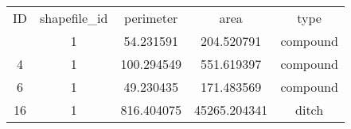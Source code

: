 \begin{tabular}{ccccc}
    \toprule
    ID & shapefile\_id & perimeter & area & type\\
    \otoprule
    1 & 1 & 54.231591 & 204.520791 & compound\\
    4 & 1 & 100.294549 & 551.619397 & compound\\
    6 & 1 & 49.230435 & 171.483569 & compound\\
    16 & 1 & 816.404075 & 45265.204341 & ditch\\
    \bottomrule
\end{tabular}
